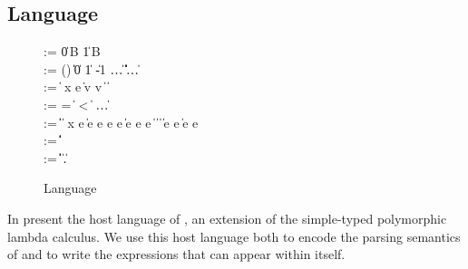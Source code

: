 \subsection{\Implang{} Language}
\label{sec:host-lang}
\begin{figure}[tp]
\small
\begin{bnf}
       \::= \cdot \| 0\,B \| 1\,B \\ 
    \::=
      () \| \itrue \| \ifalse \| 0 \| 1 \| -1 \| \dots \nlalt
      \ierr \| \data \| \off \| \iok \| \iecerr \| \iecpc \| \ldots \\

    \::= 
      \const \| %
       {\nrm x} e \| \ipair v v \nlalt
       \|  \|
       \\

    \::= 
      = \; \| \; < \; \| \inotop %
      \| \ldots \\

    \::= 
      \const \| \var \|  \|
       {\nrm x} e \| 
      \iapp e e \nlalt
       e \; e \|
      \iif e \; \ithen e \; \ielse e \nlalt
       \|  \|
       \|  \nlalt
       \nlalt
       \| \iappend e e \| \isub e {\nrm e}
      \\
      
    \::= 
      \iunitty \| \iboolty \| \iintty  \| 
      \invty \nlalt  \ibitsty \| \ioffty \| \iecty
  \\
   \meta{\ity} \::= 
      \ibasety \| \ityvar \| \iarrow \ity \ity \| \iprod \ity \ity \|
      \isum \ity \ity \nlalt
      \iseq \ity \| \forall \ityvar.\ity  \|
      \imu \ityvar \ity   
  
\end{bnf}
\caption{\Implang{} Language}
\label{fig:implang-syntax}
\end{figure}

In  present the host language of \ddc{}, an
extension of the simple-typed polymorphic lambda calculus. 
We use this host language both to encode the parsing semantics of \ddc{} 
and to write the expressions that can appear within \ddc{} itself.

